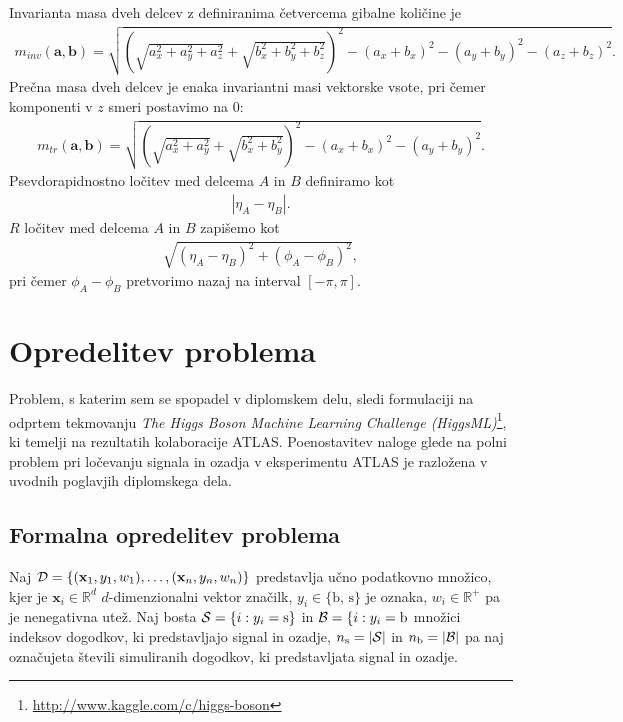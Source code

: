 \documentclass[11pt,a4paper,openany]{book}
\begin{document}
Invarianta masa dveh delcev z definiranima četvercema gibalne količine je
\begin{eqnarray}
	m_{inv}(\mathbf{a}, \mathbf{b}) =
		\sqrt{
			\left(
				\sqrt{a_x^2 + a_y^2 + a_z^2} + \sqrt{b_x^2 + b_y^2 + b_z^2}
			\right)^2
			- (a_x + b_x)^2
			- (a_y + b_y)^2
			- (a_z + b_z)^2
		}.
	\label{eq:invmass}
\end{eqnarray}
Prečna masa dveh delcev je enaka invariantni masi vektorske vsote, pri čemer komponenti v $z$ smeri postavimo na 0:
\begin{eqnarray}
	m_{tr}(\mathbf{a}, \mathbf{b}) =
		\sqrt{
			\left(
			\sqrt{a_x^2 + a_y^2} + \sqrt{b_x^2 + b_y^2}
			\right)^2
			- (a_x + b_x)^2
			- (a_y + b_y)^2
		}.	
	\label{eq:invmasstransverse}
\end{eqnarray}
Psevdorapidnostno ločitev med delcema $A$ in $B$ definiramo kot
\begin{eqnarray}
	|\eta_A - \eta_B|.
	\label{eq:pseudorapidityseparation}
\end{eqnarray}
$R$ ločitev med delcema $A$ in $B$ zapišemo kot
\begin{eqnarray}
	\sqrt{(\eta_A - \eta_B)^2 + (\phi_A - \phi_B)^2},
	\label{eq:rseparation}
\end{eqnarray}
pri čemer $\phi_A - \phi_B$ pretvorimo nazaj na interval $[-\pi, \pi]$.
\chapter{Opredelitev problema}

Problem, s katerim sem se spopadel v diplomskem delu, sledi formulaciji na odprtem tekmovanju \textit{The Higgs Boson Machine Learning Challenge (HiggsML)}\footnote{ \url{http://www.kaggle.com/c/higgs-boson}}, ki temelji na rezultatih kolaboracije ATLAS\cite{Adam-Bourdarios14}. Poenostavitev naloge glede na polni problem pri ločevanju signala in ozadja v eksperimentu ATLAS je razložena v uvodnih poglavjih diplomskega dela.

\section{Formalna opredelitev problema}

Naj ${\cal D} = \left\{({\mathbf x}_1, y_1, w_1), \dots, ({\mathbf x}_n, y_n, w_n) \right\}$ predstavlja učno podatkovno množico, kjer je $\mathbf{x}_i \in \mathbb{R}^d$ $d$-dimenzionalni vektor značilk, $y_i \in \{\text{b, s}\}$ je oznaka, $w_i \in \mathbb{R}^+$ pa je nenegativna utež. Naj bosta ${\cal S} = \{i : y_i = \text{s}\}$ in ${\cal B} = \{i : y_i = \text{b}$ množici indeksov dogodkov, ki predstavljajo signal in ozadje, $n_\text{s} = |{\cal S}|$ in $n_\text{b} = |{\cal B}|$ pa naj označujeta števili simuliranih dogodkov, ki predstavljata signal in ozadje.
\end{document}
